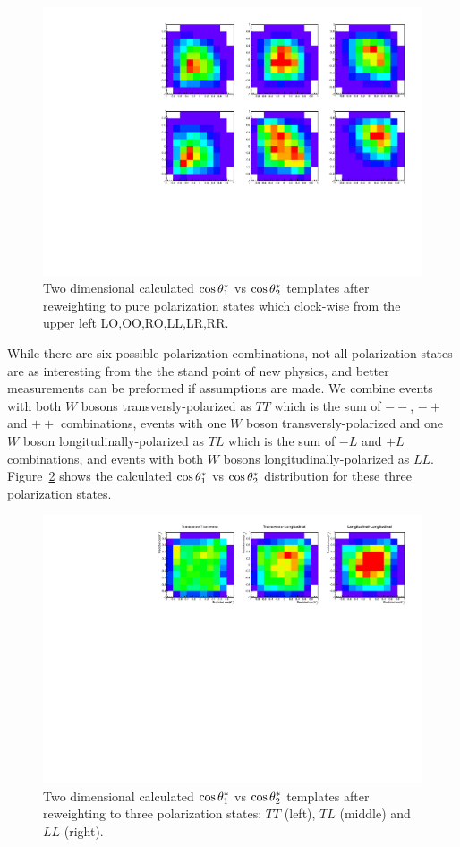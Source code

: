 \begin{figure}
\includegraphics[width=.49\textwidth]{./fig/2D_temps.pdf}
\caption{\label{fig:2D_polarization_six}Two dimensional calculated $ \cos \theta^{*}  _1$ vs $ \cos \theta^{*}  _2$ templates after reweighting to pure polarization states which clock-wise from the upper left LO,OO,RO,LL,LR,RR.}
\end{figure}
 
While there are six possible polarization combinations, not all polarization states are as interesting from the the stand point of new physics, 
and better measurements can be preformed if assumptions are made. 
We combine events with both $W$ bosons transversly-polarized as $TT$ which is the sum of $--$, $-+$ and $++$ combinations, events with one $W$ boson transversly-polarized and one $W$ boson longitudinally-polarized as $TL$ which is the sum of $-L$ and $+L$ combinations, and events with both $W$ bosons longitudinally-polarized 
as $LL$. Figure~\ref{fig:2D_polarization_three} shows the calculated $ \cos \theta^{*}  _1$ vs $ \cos \theta^{*}  _2$ distribution for these three polarization states. 

\begin{figure}
\includegraphics[width=.49\textwidth]{./fig/templates.pdf}
\caption{\label{fig:2D_polarization_three}Two dimensional calculated $ \cos \theta^{*}  _1$ vs $ \cos \theta^{*}  _2$ templates after reweighting to three polarization states: $TT$ (left), $TL$ (middle) and $LL$ (right).}
\end{figure}

